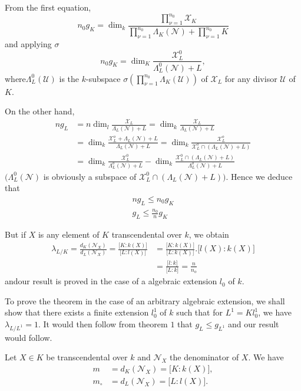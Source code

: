 From the first equation,
$$
n_0 g_K = \dim_k \frac{\prod\limits_{\nu =1}^{n_0} \mathscr{X}
  _K}{\prod\limits_{\nu=1}^{n_0} \Lambda_K (\mathscr{N}) +
  \prod\limits_{\nu=1}^{n_0} K} 
$$
and applying $\sigma$
$$
n_0 g_K = \dim_K \frac{\mathscr{X}^0_L}{\Lambda_L^0 (\mathscr{N}) +L},
$$
where\pageoriginale $\Lambda_L^0 (\mathscr{U})$ is the $k$-subspace $\sigma
(\prod\limits_{\nu=1}^{n_0} \Lambda_K (\mathscr{U}))$ of
$\mathscr{X}_L$ for any divisor $\mathscr{U}$ of $K$.  

On the other hand,
\begin{align*}
  n g_L & = n\dim_l \frac{\mathscr{X}_L}{\Lambda_L (\mathscr{N}) +L}
  = \dim_k \frac{\mathscr{X}_L}{\Lambda_L (\mathscr{N})+ L}\\ 
  & = \dim_k \frac{\mathscr{X}_L^o + \Lambda_L (\mathscr{N}) +
    L}{\Lambda_L (\mathscr{N}) +L} = \dim_k \frac{\mathscr{X}_L^o}{
    \mathscr{X}_L^o \cap (\Lambda_L (\mathscr{N})+ L)}\\ 
  &=\dim_k \frac{\mathscr{X}^0_L}{\Lambda_L^o (\mathscr{N})+ L} -
  \dim_k \frac{\mathscr{X}_L^0 \cap (\Lambda_L
    (\mathscr{N})+L)}{\Lambda_L^o (\mathscr{N}) + L}
\end{align*}
$(\Lambda_L^0(\mathscr{N})$ is obviously a subspace of
$\mathscr{X}_L^0 \cap (\Lambda_L (\mathscr{N}) +L))$. Hence we deduce
that  
\begin{gather*}
  n g_L \le n_0 g_K\\
  g_L \le \frac{n_0}{n} g_K
\end{gather*}

But if $X$ is any element of $K$ transcendental over $k$, we obtain
\begin{align*}
  \lambda_{L/K} = \frac{d_K (\mathscr{N}_X)}{d_L (\mathscr{N}_X)} =
  \frac{\big[ K : k (X)\big]}{\big[ L:l(X)\big]} & = \frac{\big[K : k
      (X)\big]}{\big[ L : k (X)\big]} . \big[l(X) : k (X)\big]\\ 
  & = \frac{\big[ l: k\big]}{\big[ L:k\big]} = \frac{n}{n_o}
\end{align*}
and\pageoriginale our result is proved in the case of a algebraic extension $l_0$ of $k$.

To prove the theorem in the case of an arbitrary algebraic extension,
we shall show that there exists a finite extension $l^1_0$ of $k$ such
that for $L^1 = Kl^1_0$, we have $\lambda_{L/L^1} = 1$. It would then
follow from theorem $1$ that $g_L \leq g_{L^1}$ and our result would
follow. 

Let $X \in K$ be transcendental over $k$ and $\mathscr{N}_X$ the
denominator of $X$. We have 
\begin{align*}
  m &= d_K (\mathscr{N}_X ) = \bigg[ K : k(X) \bigg] ,\\
  m_\circ &= d_L (\mathscr{N}_X) = \bigg [L : l(X) \bigg] .
\end{align*}

